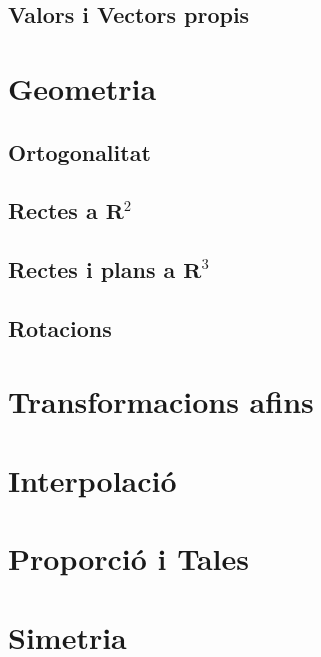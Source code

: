\documentclass[12pt]{article}
\begin{document}
\begin{ExerciseList}
\subsection{Valors i Vectors propis}




\section{Geometria}
\subsection{Ortogonalitat}



\subsection{Rectes a $\mathbf{R}^2$}





\subsection{Rectes i plans a $\mathbf{R}^3$}




\subsection{Rotacions}

\section{Transformacions afins}







\section{Interpolació}



\section{Proporció i Tales}


\section{Simetria}


\end{ExerciseList}
\newpage






\end{document}
